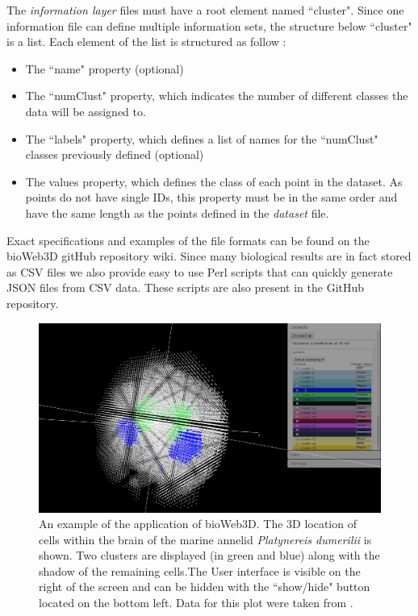 \documentclass{bioinfo}
\begin{document}
The {\it{information layer}} files must have a root element named  ``cluster". Since one information file can define multiple information sets, the structure below ``cluster" is a list. Each element of the list is structured as follow :
\begin{itemize}
\item The ``name" property (optional)
\item The ``numClust" property, which indicates the number of different classes the data will be assigned to.
\item The ``labels" property, which defines a list of names for the ``numClust" classes previously defined (optional)
\item The values property, which defines the class of each point in the dataset. As points do not have single IDs, this property must be in the same order and have the same length as the points defined in the {\it{dataset}} file.
\end{itemize}
Exact specifications and examples of the file formats can be found on the bioWeb3D gitHub repository wiki. Since many biological results are in fact stored as CSV files we also provide easy to use Perl scripts that can quickly generate JSON files from CSV data. These scripts are also present in the GitHub repository.


\begin{figure}[h!]%
\centerline{\includegraphics[totalheight=0.2\textheight]{fig1.png}}
\caption{An example of the application of bioWeb3D. The 3D location of cells within the brain of the marine annelid {\it{Platynereis dumerilii}} is shown. Two clusters are displayed (in green and blue) along with the shadow of the remaining cells.The User interface is visible on the right of the screen and can be hidden with the ``show/hide" button located on the bottom left. Data for this plot were taken from \citep{Tomer10}.}\label{fig:01}
\end{figure}
\end{document}
